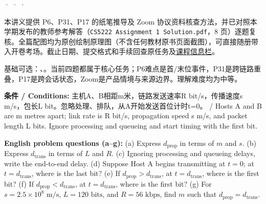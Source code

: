 


 ·  ·  · 


本讲义提供 P6、P31、P17 的纸笔推导及 Zoom 协议资料核查方法，并已对照本学期发布的教师参考解答（\texttt{CS5222 Assignment 1 Solution.pdf}，8 页）逐题复核。全篇配图均为原创绘制原理图（不含任何教材原书页面截图），可直接随册带入开卷考场。截止日期、提交格式和手续回查原任务及\href{https://crazyshout.github.io/micro-course/notices.html}{课程信息栏}。


基础可选：、。当前四题都属于核心任务；P6难点是首/末位事件，P31是跨链路重叠，P17是跨会话状态，Zoom是产品情境与来源边界。理解难度均为中等。









\textbf{条件 / Conditions:} 主机A、B相距m米，链路发送速率R bit/s，传播速度s m/s，包长L bit。忽略处理、排队，从A开始发送首位计时t=0。 / Hosts A and B are m metres apart; link rate is R bit/s, propagation speed s m/s, and packet length L bits. Ignore processing and queueing and start timing with the first bit.

\textbf{English problem questions (a–g):} (a) Express \(d_{\mathrm{prop}}\) in terms of \(m\) and \(s\). (b) Express \(d_{\mathrm{trans}}\) in terms of \(L\) and \(R\). (c) Ignoring processing and queueing delays, write the end-to-end delay. (d) Suppose Host A begins transmitting at \(t=0\); at \(t=d_{\mathrm{trans}}\), where is the last bit? (e) If \(d_{\mathrm{prop}} > d_{\mathrm{trans}}\), at \(t=d_{\mathrm{trans}}\), where is the first bit? (f) If \(d_{\mathrm{prop}} < d_{\mathrm{trans}}\), at \(t=d_{\mathrm{trans}}\), where is the first bit? (g) For \(s = 2.5\times 10^8\text{ m/s}\), \(L = 120\text{ bits}\), and \(R = 56\text{ kbps}\), find \(m\) such that \(d_{\mathrm{prop}} = d_{\mathrm{trans}}\).

